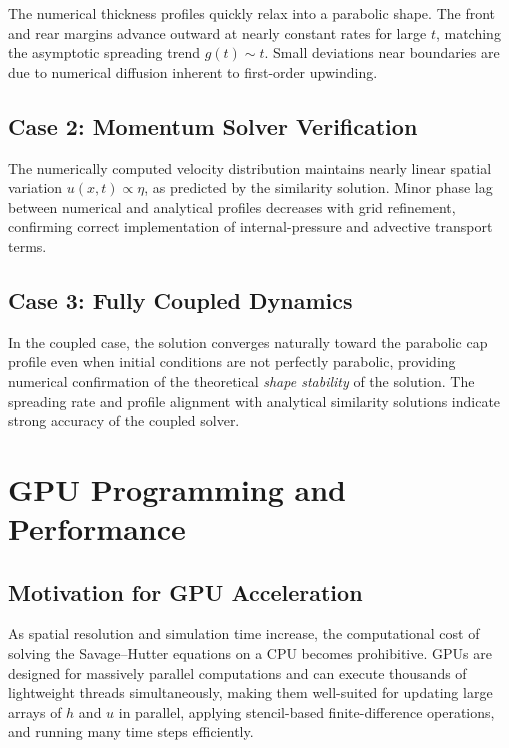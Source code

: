 \documentclass[10pt, conference]{FMFP2023}
\begin{document}
The numerical thickness profiles quickly relax into a parabolic shape.
The front and rear margins advance outward at nearly constant rates
for large $t$, matching the asymptotic spreading trend $g(t)\sim t$.
Small deviations near boundaries are due to numerical diffusion
inherent to first-order upwinding.

\subsection{Case 2: Momentum Solver Verification}

The numerically computed velocity distribution maintains nearly linear
spatial variation $u(x,t)\propto\eta$, as predicted by the similarity
solution.
Minor phase lag between numerical and analytical profiles decreases
with grid refinement, confirming correct implementation of
internal-pressure and advective transport terms.

\subsection{Case 3: Fully Coupled Dynamics}

In the coupled case, the solution converges naturally toward the
parabolic cap profile even when initial conditions are not perfectly
parabolic, providing numerical confirmation of the theoretical
\emph{shape stability} of the solution.
The spreading rate and profile alignment with analytical similarity
solutions indicate strong accuracy of the coupled solver.

\section{GPU Programming and Performance}

\subsection{Motivation for GPU Acceleration}

As spatial resolution and simulation time increase, the computational
cost of solving the Savage--Hutter equations on a CPU becomes
prohibitive.
GPUs are designed for massively parallel computations and can execute
thousands of lightweight threads simultaneously, making them
well-suited for updating large arrays of $h$ and $u$ in parallel,
applying stencil-based finite-difference operations, and running many
time steps efficiently.
\end{document}
